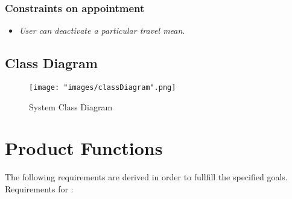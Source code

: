 \subsubsection{Constraints on appointment} \label{subsubsect:constronappoint}
\begin{itemize}
\item \textit{User can deactivate a particular travel mean}.
\end{itemize}

\subsection{Class Diagram}
\begin{figure}[H]
\begin{center}
\texttt{[image: "images/classDiagram".png]}
\caption{System Class Diagram}
\end{center}
\end{figure}

\section{Product Functions}

The following requirements are derived in order to fullfill the specified goals.
\\


Requirements for :

